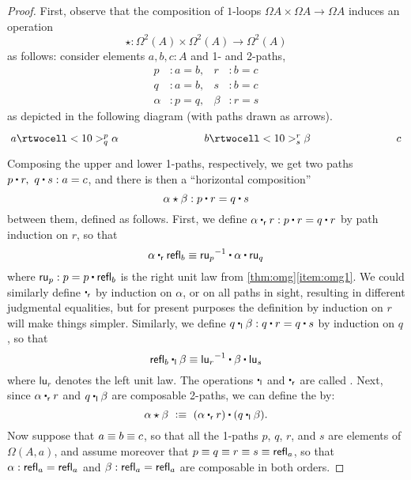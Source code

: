 \begin{proof}
First, observe that the composition of $1$-loops $\Omega A\times \Omega A\to \Omega A$ induces an operation 
\[
\star : \Omega^2(A)\times \Omega^2(A)\to \Omega^2(A)
\]
as follows: consider elements $a, b, c : A$ and 1- and 2-paths,
%
\begin{align*}
  p &: a = b,       &       r &: b = c \\
  q &: a = b,       &       s &: b = c \\
  \alpha &: p = q,  &   \beta &: r = s
\end{align*}
%
as depicted in the following diagram (with paths drawn as arrows).
\[
 \xymatrix@+5em{
   {a} \rtwocell<10>^p_q{\alpha}
   &
   {b} \rtwocell<10>^r_s{\beta}
   &
   {c}
 }
\]
Composing the upper and lower 1-paths, respectively, we get two paths $p\ct r,\ q\ct s : a = c$, and there is then a ``horizontal composition''
%
\begin{equation*}
  \alpha\hct\beta : p\ct r = q\ct s
\end{equation*}
%
between them, defined as follows.
First, we define $\alpha \rightwhisker r : p\ct r = q\ct r$ by path induction on $r$, so that
\[ \alpha \rightwhisker \refl{b} \jdeq \opp{\mathsf{ru}_p} \ct \alpha \ct \mathsf{ru}_q \]
where $\mathsf{ru}_p : p = p \ct \refl{b}$ is the right unit law from \autoref{thm:omg}\ref{item:omg1}.
We could similarly define $\rightwhisker$ by induction on $\alpha$, or on all paths in sight, resulting in different judgmental equalities, but for present purposes the definition by induction on $r$ will make things simpler.
Similarly, we define $q\leftwhisker \beta : q\ct r = q\ct s$ by induction on $q$, so that
\[ \refl{b} \leftwhisker \beta \jdeq \opp{\mathsf{lu}_r} \ct \beta \ct \mathsf{lu}_s \]
where $\mathsf{lu}_r$ denotes the left unit law.
The operations $\leftwhisker$ and $\rightwhisker$ are called .
Next, since $\alpha \rightwhisker r$ and $q\leftwhisker \beta$ are composable 2-paths, we can define the 
%
%
by:
\[
\alpha\hct\beta\ \defeq\ (\alpha\rightwhisker r) \ct (q\leftwhisker \beta).
\]
Now suppose that $a \equiv  b \equiv  c$, so that all the 1-paths $p$, $q$, $r$, and $s$ are elements of $\Omega(A,a)$, and assume moreover that $p\equiv q \equiv r \equiv s\equiv \mathsf{refl}_{a}$, so that $\alpha:\mathsf{refl}_{a} = \mathsf{refl}_{a}$ and $\beta:\mathsf{refl}_{a} = \mathsf{refl}_{a}$ are composable in both orders.

\end{proof}
